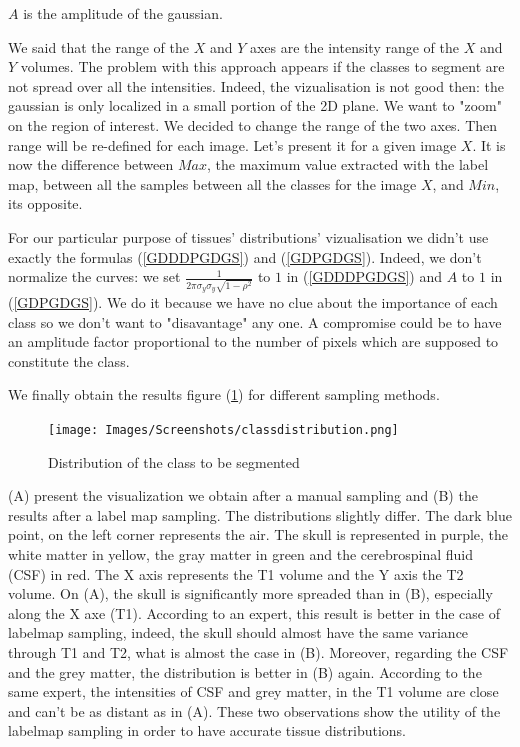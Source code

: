 $A$ is the amplitude of the gaussian.
\par
We said that the range of the $X$ and $Y$ axes are the intensity range of the $X$ and $Y$ volumes. The problem with this approach appears if the classes to segment are not spread over all the intensities. Indeed, the vizualisation is not good then: the gaussian is only localized in a small portion of the 2D plane. We want to "zoom" on the region of interest. We decided to change the range of the two axes. Then range will be re-defined for each image. Let's present it for a given image $X$. It is now the difference between $Max$, the maximum value extracted with the label map, between all the samples between all the classes for the image $X$, and $Min$, its opposite.
\par
For our particular purpose of tissues' distributions' vizualisation we didn't use exactly the formulas (\ref{GDDDPGDGS}) and (\ref{GDPGDGS}). Indeed, we don't normalize the curves: we set $\frac{1}{2 \pi \sigma_y \sigma_y \sqrt{1-\rho^2}}$ to $1$ in (\ref{GDDDPGDGS}) and $A$ to $1$ in (\ref{GDPGDGS}). We do it because we have no clue about the importance of each class so we don't want to "disavantage" any one. A compromise could be to have an amplitude factor proportional to the number of pixels which are supposed to constitute the class.
\par 
We finally obtain the results figure (\ref{fig:intensitynormalization}) for different sampling methods.
\begin{figure}\centering\label{classdistribution}
  \texttt{[image: Images/Screenshots/classdistribution.png]}
  \caption{Distribution of the class to be segmented}\label{fig:intensitynormalization}
 \end{figure}
 
(A) present the visualization we obtain after a manual sampling and (B) the results after a label map sampling. The distributions slightly differ. The dark blue point, on the left corner represents the air. The skull is represented in purple, the white matter in yellow, the gray matter in green and the cerebrospinal fluid (CSF) in red. The X axis represents the T1 volume and the Y axis the T2 volume. On (A), the skull is significantly more spreaded than in (B), especially along the X axe (T1). According to an expert, this result is better in the case of labelmap sampling, indeed, the skull should almost have the same variance through T1 and T2, what is almost the case in (B). Moreover, regarding the CSF and the grey matter, the distribution is better in (B) again. According to the same expert, the intensities of CSF and grey matter, in the T1 volume are close and can't be as distant as in (A). These two observations show the utility of the labelmap sampling in order to have accurate tissue distributions.


